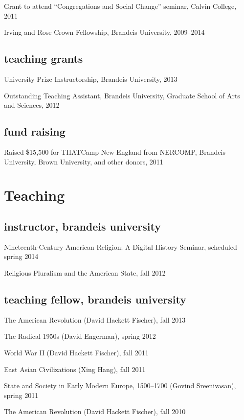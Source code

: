 \documentclass[11pt]{article}
\begin{document}
Grant to attend ``Congregations and Social Change'' seminar, Calvin 
College, 2011

Irving and Rose Crown Fellowship, Brandeis University, 2009--2014

\subsection{teaching grants}

University Prize Instructorship, Brandeis University, 2013

Outstanding Teaching Assistant, Brandeis University, Graduate School of 
Arts and Sciences, 2012

\subsection{fund raising}

Raised \$15,500 for THATCamp New England from NERCOMP, Brandeis 
University, Brown University, and other donors, 2011

\section{Teaching}

\subsection{instructor, brandeis university}

Nineteenth-Century American Religion: A Digital History Seminar, 
scheduled spring 2014

Religious Pluralism and the American State, fall 2012

\subsection{teaching fellow, brandeis university}

The American Revolution (David Hackett Fischer), fall 2013

The Radical 1950s (David Engerman), spring 2012

World War II (David Hackett Fischer), fall 2011

East Asian Civilizations (Xing Hang), fall 2011

State and Society in Early Modern Europe, 1500--1700
(Govind Sreenivasan), spring 2011

The American Revolution (David Hackett Fischer), fall 2010
\end{document}
